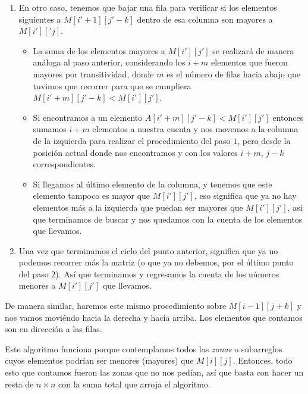 \documentclass[letterpaper,11pt]{article}
\begin{document}
\begin{enumerate}
\begin{enumerate}
\begin{enumerate}
            \item En otro caso, tenemos que bajar una fila para verificar si los
            elementos siguientes a $M[i'+1][j'-k]$ dentro de esa columna son 
            mayores a $M[i']['j]$.
            \begin{itemize}
                \item La suma de los elementos mayores a $M[i'][j']$ se 
                realizará de manera análoga al paso anterior, considerando los 
                $i+m$ elementos que fueron mayores por transitividad, donde 
                $m$ es el número de filas hacia abajo que tuvimos que recorrer 
                para que se cumpliera $M[i'+m][j'-k] < M[i'][j']$.

                \item Si encontramos a un elemento $A[i'+m][j'-k] < M[i'][j']$
                entonces sumamos $i+m$ elementos a nuestra cuenta y nos movemos 
                a la columna de la izquierda para realizar el procedimiento del 
                paso $1$, pero desde la posición actual donde nos encontramos 
                y con los valores $i+m$, $j-k$ correspondientes.

                \item Si llegamos al último elemento de la columna, y tenemos 
                que este elemento tampoco es mayor que $M[i'][j']$, eso 
                significa que ya no hay elementos más a la izquierda que puedan 
                ser mayores que $M[i'][j']$, así que terminamos de buscar y nos 
                quedamos con la cuenta de los elementos que llevamos. 
            \end{itemize}

            \item Una vez que terminamos el ciclo del punto anterior, significa 
            que ya no podemos recorrer más la matriz (o que ya no debemos, por 
            el último punto del paso $2$). Así que terminamos y regresamos la 
            cuenta de los números menores a $M[i'][j']$ que llevamos.
        \end{enumerate}

        De manera similar, haremos este mismo procedimiento sobre $M[i-1][j+k]$
        y nos vamos moviéndo hacia la derecha y hacia arriba. Los elementos 
        que contamos son en dirección a las filas. 

        Este algoritmo funciona porque contemplamos todos las \textit{zonas} 
        o subarreglos cuyos elementos podrían ser menores (mayores) que 
        $M[i][j]$. Entonces, todo esto que contamos fueron las zonas que no 
        nos pedían, así que basta con hacer un resta de $n \times n$ con la
        suma total que arroja el algoritmo.


\end{enumerate}
\end{enumerate}
\end{document}
